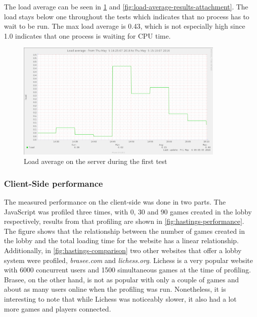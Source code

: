 \documentclass[a4paper]{article}
\begin{document}
The load average can be seen in \cref{fig:load-average-results} and \cref{fig:load-average-results-attachment}. The load stays below one throughout the tests which indicates that no process has to wait to be run. The max load average is 0.43, which is not especially high since 1.0 indicates that one process is waiting for CPU time.

\begin{figure}[H]
    \includegraphics[width=0.9\textwidth]{figure/serversidePerformance/2016-05-05-load-average-game-test.png}
    \caption{Load average on the server during the first test}
    \label{fig:load-average-results}
\end{figure}


\subsubsection{Client-Side performance}
\label{subsub:client-performance-results}
The measured performance on the client-side was done in two parts. The JavaScript was profiled three times, with 0, 30 and 90 games created in the lobby respectively, results from that profiling are shown in \cref{fig:hastings-performance}. The figure shows that the relationship between the number of games created in the lobby and the total loading time for the website has a linear relationship. Additionally, in \cref{fig:hastings-comparison} two other websites that offer a lobby system were profiled, \textit{brasee.com} and \textit{lichess.org}. Lichess is a very popular website with 6000 concurrent users and 1500 simultaneous games at the time of profiling. Brasee, on the other hand, is not as popular with only a couple of games and about as many users online when the profiling was run. Nonetheless, it is interesting to note that while Lichess was noticeably slower, it also had a lot more games and players connected.
\end{document}
